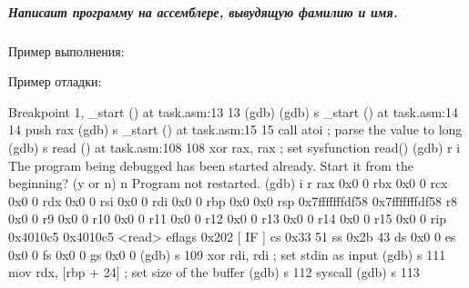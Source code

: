 \subparagraph{Написаит программу на ассемблере, вывудящую фамилию и имя.}


Пример выполнения:


Пример отладки:

\begin{code}
Breakpoint 1, _start () at task.asm:13
13		
(gdb) 
(gdb) s
_start () at task.asm:14
14		push rax
(gdb) s
_start () at task.asm:15
15		call atoi			; parse the value to long
(gdb) s
read () at task.asm:108
108		xor rax, rax			; set sysfunction read()
(gdb) r i
The program being debugged has been started already.
Start it from the beginning? (y or n) n
Program not restarted.
(gdb) i r
rax            0x0                 0
rbx            0x0                 0
rcx            0x0                 0
rdx            0x0                 0
rsi            0x0                 0
rdi            0x0                 0
rbp            0x0                 0x0
rsp            0x7fffffffdf58      0x7fffffffdf58
r8             0x0                 0
r9             0x0                 0
r10            0x0                 0
r11            0x0                 0
r12            0x0                 0
r13            0x0                 0
r14            0x0                 0
r15            0x0                 0
rip            0x4010c5            0x4010c5 <read>
eflags         0x202               [ IF ]
cs             0x33                51
ss             0x2b                43
ds             0x0                 0
es             0x0                 0
fs             0x0                 0
gs             0x0                 0
(gdb) s
109		xor rdi, rdi			; set stdin as input
(gdb) s
111		mov rdx, [rbp + 24]		; set size of the buffer
(gdb) s
112		syscall
(gdb) s
113
\end{code}